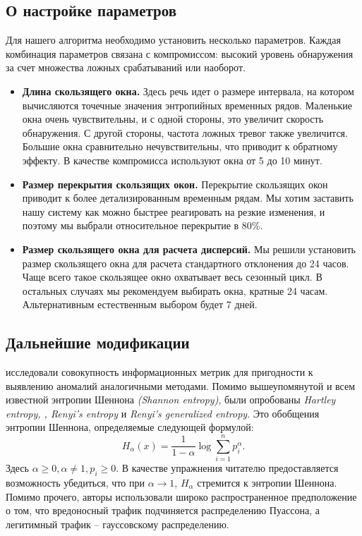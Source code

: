 \documentclass[]{interact}
\theoremstyle{plain}%
\theoremstyle{definition}
\theoremstyle{remark}
\begin{document}
\subsection{О настройке параметров}
Для нашего алгоритма необходимо установить несколько параметров. Каждая комбинация параметров связана с компромиссом: высокий уровень обнаружения за счет множества ложных срабатываний или наоборот.

\begin{itemize}
    \item \textbf{Длина скользящего окна.} Здесь речь идет о размере интервала, на котором вычисляются точечные значения энтропийных временных рядов. Маленькие окна очень чувствительны, и с одной стороны, это увеличит скорость обнаружения. С другой стороны, частота ложных тревог также увеличится. Большие окна сравнительно нечувствительны, что приводит к обратному эффекту. В качестве компромисса используют окна от 5 до 10 минут.
    \item \textbf{Размер перекрытия скользящих окон.} Перекрытие скользящих окон приводит к более детализированным временным рядам. Мы хотим заставить нашу систему как можно быстрее реагировать на резкие изменения, и поэтому мы выбрали относительное перекрытие в $80\%$.
    \item \textbf{Размер скользящего окна для расчета дисперсий.} Мы решили установить размер скользящего окна для расчета стандартного отклонения до 24 часов. Чаще всего такое скользящее окно охватывает весь сезонный цикл. В остальных случаях мы рекомендуем выбирать окна, кратные 24 часам. Альтернативным естественным выбором будет 7 дней.
\end{itemize}

\subsection{Дальнейшие модификации}
\cite{Bhu14} исследовали совокупность информационных метрик для пригодности к выявлению аномалий аналогичными методами. Помимо вышеупомянутой и всем известной энтропии Шеннона \textit{(Shannon entropy)}, были опробованы \textit{Hartley entropy,
, Renyi's entropy} и \textit{Renyi's generalized
entropy}. Это обобщения энтропии Шеннона, определяемые следующей формулой:
\begin{equation}
    H_{\alpha} (x) = \frac{1}{1 - \alpha} \log \sum_{i=1}^n p_i^{\alpha}.
\end{equation}
 Здесь $\alpha \geq 0, \alpha \neq 1, p_i \geq 0$. В качестве упражнения читателю предоставляется возможность убедиться, что при $\alpha \rightarrow 1$, $H_{\alpha}$ стремится к энтропии Шеннона.  Помимо прочего, авторы использовали широко распространенное предположение о том, что вредоносный трафик подчиняется распределению Пуассона, а легитимный трафик -- гауссовскому распределению.
\end{document}
